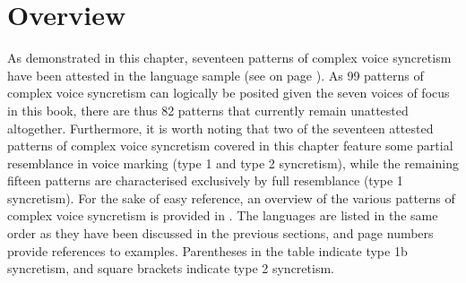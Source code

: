 \section{Overview} \label{sec:complex-syncretism:overview}
As demonstrated in this chapter, seventeen patterns of complex voice syncretism have been attested in the language sample (see  on page \pageref{tab:ch5:complex-patterns}). As 99 patterns of complex voice syncretism can logically be posited given the seven voices of focus in this book, there are thus 82 patterns that currently remain unattested altogether. Furthermore, it is worth noting that two of the seventeen attested patterns of complex voice syncretism covered in this chapter feature some partial resemblance in voice marking (type 1 and type 2 syncretism), while the remaining fifteen patterns are characterised exclusively by full resemblance (type 1 syncretism). For the sake of easy reference, an overview of the various patterns of complex voice syncretism is provided in . The languages are listed in the same order as they have been discussed in the previous sections, and page numbers provide references to examples. Parentheses in the table indicate type 1b syncretism, and square brackets indicate type 2 syncretism. 

